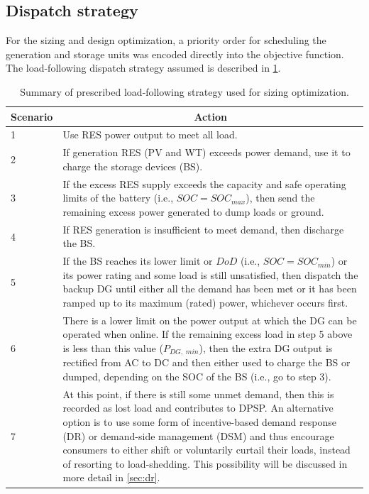 \documentclass[final,3p,times]{elsarticle}
\begin{document}
\subsection{Dispatch strategy \label{sec:disp_strat}}
For the sizing and design optimization, a priority order for scheduling the generation and storage units was encoded directly into the objective function. The load-following dispatch strategy assumed is described in \cref{tab:dispatch_strat_for_sizing}.
\begin{table}[htbp] 
\centering
\begin{tabular}{p{0.75cm} p{13cm}}
\toprule
\multicolumn{1}{c}{\textbf{Scenario}} & \multicolumn{1}{c}{\textbf{Action}}    \\
\midrule
1 & Use RES power output to meet all load. \\ [1ex]
2 & If generation RES (PV and WT) exceeds power demand, use it to charge the storage devices (BS). \\ [1ex]
3 & If the excess RES supply exceeds the capacity and safe operating limits of the battery (i.e., $SOC = SOC_{max}$), then send the remaining excess power generated to dump loads or ground. \\ [1ex]
4 & If RES generation is insufficient to meet demand, then discharge the BS. \\ [1ex]
5 & If the BS reaches its lower limit or $DoD$ (i.e., $SOC = SOC_{min}$) or its power rating and some load is still unsatisfied, then dispatch the backup DG until either all the demand has been met or it has been ramped up to its maximum (rated) power, whichever occurs first. \\ [1ex]
6 & There is a lower limit on the power output at which the DG can be operated when online. If the remaining excess load in step 5 above is less than this value ($P_{DG,\;min}$), then the extra DG output is rectified from AC to DC and then either used to charge the BS or dumped, depending on the SOC of the BS (i.e., go to step 3). \\ [1ex]
7 & At this point, if there is still some unmet demand, then this is recorded as lost load and contributes to DPSP. An alternative option is to use some form of incentive-based demand response (DR) or demand-side management (DSM) and thus encourage consumers to either shift or voluntarily curtail their loads, instead of resorting to load-shedding. This possibility will be discussed in more detail in \cref{sec:dr}. \\ [1ex]
\bottomrule
\end{tabular}
\caption{Summary of prescribed load-following strategy used for sizing optimization.}
\label{tab:dispatch_strat_for_sizing} 
\end{table}
\end{document}
